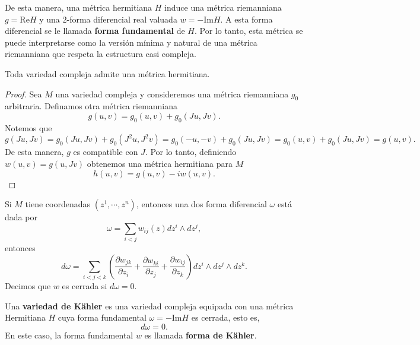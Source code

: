 De esta manera, una métrica hermitiana $H$ induce una métrica riemanniana $g=\mathrm{Re}H$ y una $2$-forma diferencial real valuada $w=-\mathrm{Im}H$. A esta forma diferencial se le llamada \textbf{forma fundamental} de $H$. Por lo tanto, esta métrica se puede interpretarse como la versión mínima y natural de una métrica riemanniana que respeta la estructura casi compleja.

\begin{propo}
	Toda variedad compleja admite una métrica hermitiana.
\end{propo}
\begin{proof}
	Sea $M$ una variedad compleja y consideremos una métrica riemanniana $g_0$ arbitraria. Definamos otra métrica riemanniana
	\begin{equation*}
		g(u,v)=g_0(u,v)+g_0(Ju,Jv).
	\end{equation*}  
	Notemos que
	\begin{equation*}
		g(Ju,Jv)=g_0(Ju,Jv)+g_0(J^2u,J^2v)=g_0(-u,-v)+g_0(Ju,Jv)=g_0(u,v)+g_0(Ju,Jv)=g(u,v).
	\end{equation*}
	De esta manera, $g$ es compatible con $J$. Por lo tanto, definiendo $w(u,v)=g(u,Jv)$ obtenemos una métrica hermitiana para $M$
	\begin{equation*}
		h(u,v)=g(u,v)-iw(u,v).
	\end{equation*}
\end{proof}                                     

Si $M$ tiene coordenadas $(z^1,\cdots,z^n)$, entonces una dos forma diferencial $\omega$ está dada por
\begin{equation*}
	\omega=\sum_{i<j}w_{ij}(z)dz^i\wedge dz^j,
\end{equation*}
entonces
\begin{equation*}
	d\omega=\sum_{i<j<k}\left( \frac{\partial w_{jk}}{\partial z_i}+\frac{\partial w_{ki}}{\partial z_j}+\frac{\partial w_{ij}}{\partial z_k}\right)dz^i\wedge dz^j\wedge dz^k.
\end{equation*}
Decimos que $w$ es cerrada si $d\omega=0$.

\begin{definition}
	Una \textbf{variedad de Kähler} es una variedad compleja equipada con una métrica Hermitiana $H$ cuya forma fundamental $\omega=-\mathrm{Im}H$ es cerrada, esto es,
	\begin{equation*}
		d\omega=0.
	\end{equation*}
	En este caso, la forma fundamental $w$ es llamada \textbf{forma de Kähler}.
\end{definition}

